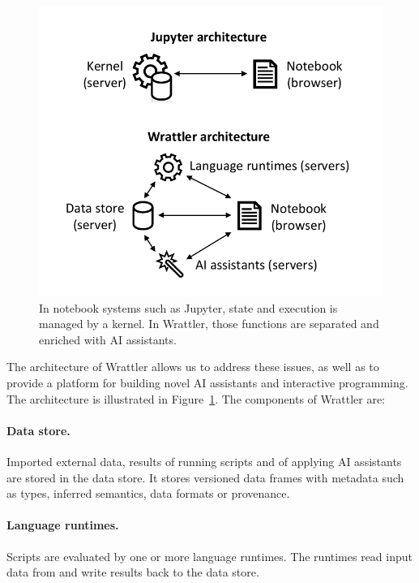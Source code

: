 \documentclass[sigplan,preprint,10pt]{acmart}\settopmatter{printfolios=true,printccs=false,printacmref=false}
\theoremstyle{plain}
\theoremstyle{definition}
\begin{document}
\begin{figure}
\vspace{-0.5em}
\includegraphics[scale=0.6]{diagram.pdf}
\vspace{-0.5em}
\caption{\small{In notebook systems such as Jupyter, state and execution is managed by a kernel. In
  Wrattler, those functions are separated and enriched with AI assistants.}}
\label{fig:arch}
\vspace{-0.5em}
\end{figure}


The architecture of Wrattler allows us to address these issues, as well as to provide a platform
for building novel AI assistants and interactive programming. The architecture is illustrated
in Figure~\ref{fig:arch}. The components of Wrattler are:
%
\paragraph{Data store.} Imported external data, results of running scripts and of
applying AI assistants are stored in the data store. It stores versioned data frames with
metadata such as types, inferred semantics, data formats or provenance.

\paragraph{Language runtimes.} Scripts are evaluated by one or more language runtimes.
The runtimes read input data from and write results back to the data store.
\end{document}
